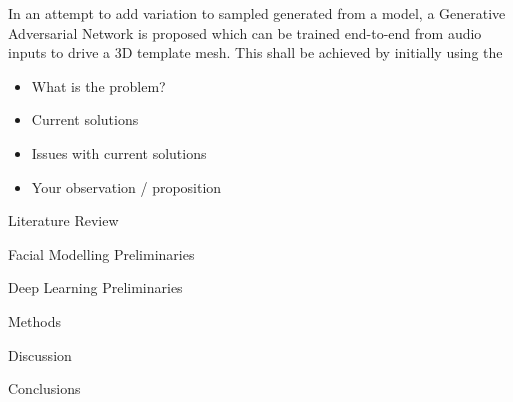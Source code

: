 \documentclass[12pt]{report}
\begin{document}
In an attempt to add variation to sampled generated from a model, a Generative Adversarial Network is proposed which can be trained end-to-end from audio inputs to drive a 3D template mesh.
This shall be achieved by initially using the 

\begin{itemize}

    \item What is the problem?
    \item Current solutions
    \item Issues with current solutions
    \item Your observation / proposition

\end{itemize}

\newpage
Literature Review

%

\newpage
Facial Modelling Preliminaries


\newpage
Deep Learning Preliminaries


\newpage
Methods


\newpage
Discussion


\newpage
Conclusions


\newpage


\end{document}
